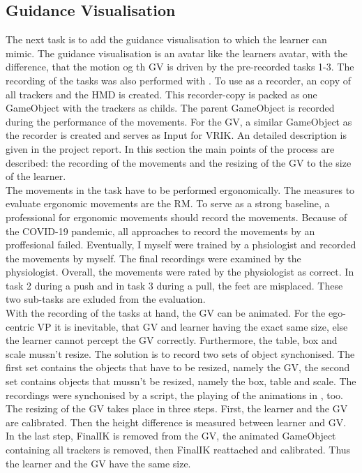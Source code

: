 \subsection{Guidance Visualisation}
\label{sec:gv}
The next task is to add the guidance visualisation to \exgo which the learner can mimic. The guidance visualisation is an avatar like the learners avatar, with the difference, that the motion og th GV is driven by the pre-recorded tasks 1-3. The recording of the tasks was also performed with \exgo. To use \exgo as a recorder, an copy of all trackers and the HMD is created. This recorder-copy is packed as one GameObject with the trackers as childs. The parent GameObject is recorded during the performance of the movements. For the GV, a similar GameObject as the recorder is created and serves as Input for VRIK. An detailed description is given in the project report. In this section the main points of the process are described: the recording of the movements and the resizing of the GV to the size of the learner.\\
The movements in the task have to be performed ergonomically. The measures to evaluate ergonomic movements are the RM. To serve as a strong baseline, a professional for ergonomic movements should record the movements. Because of the COVID-19 pandemic, all approaches to record the movements by an proffesional failed. Eventually, I myself were trained by a phsiologist and recorded the movements by myself. The final recordings were examined by the physiologist. Overall, the movements were rated by the physiologist as correct. In task 2 during a push and in task 3 during a pull, the feet are misplaced. These two sub-tasks are exluded from the evaluation.\\
With the recording of the tasks at hand, the GV can be animated. For the ego-centric VP it is inevitable, that GV and learner having the exact same size, else the learner cannot percept the GV correctly. Furthermore, the table, box and scale mussn't resize. The solution is to record two sets of object synchonised. The first set contains the objects that have to be resized, namely the GV, the second set contains objects that mussn't be resized, namely the box, table and scale. The recordings were synchonised by a script, the playing of the animations in \exgo, too. The resizing of the GV takes place in three steps. First, the learner and the GV are calibrated. Then the height difference is measured between learner and GV. In the last step, FinalIK is removed from the GV, the animated GameObject containing all trackers is removed, then FinalIK reattached and calibrated. Thus the learner and the GV have the same size.


